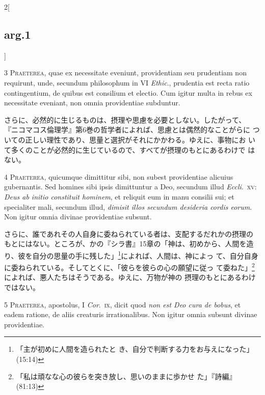 \documentclass[paper=a4paper,fontsize=10pt,jafontsize=9pt,titlepage]{jlreq}
\begin{document}
\begin{paracol}{2}[\subsection{arg.1}]

{\scshape 3 Praeterea}, quae ex necessitate eveniunt,
providentiam seu prudentiam non requirunt, unde, secundum philosophum in
VI {\itshape Ethic}., prudentia est recta ratio contingentium, de quibus est
consilium et electio. Cum igitur multa in rebus ex necessitate eveniant,
non omnia providentiae subduntur.

\switchcolumn

さらに、必然的に生じるものは、摂理や思慮を必要としない。したがって、
『ニコマコス倫理学』第6巻の哲学者によれば、思慮とは偶然的なことがらに
ついての正しい理性であり、思量と選択がそれにかかわる。ゆえに、事物にお
いて多くのことが必然的に生じているので、すべてが摂理のもとにあるわけで
はない。


{\scshape 4 Praeterea}, quicumque dimittitur sibi, non
subest providentiae alicuius gubernantis. Sed homines sibi ipsis
dimittuntur a Deo, secundum illud {\itshape Eccli}.~{\scshape xv}: {\itshape Deus ab initio constituit
hominem}, et reliquit eum in manu consilii sui; et specialiter mali,
secundum illud, {\itshape dimisit illos secundum desideria cordis eorum}. Non
igitur omnia divinae providentiae subsunt.

\switchcolumn

さらに、誰であれその人自身に委ねられている者は、支配するだれかの摂理の
もとにはない。ところが、かの『シラ書』15章の「神は、初めから、人間を造
り、彼を自分の思量の手に残した」\footnote{「主が初めに人間を造られたと
き、自分で判断する力をお与えになった」(15:14)}によれば、人間は、神によっ
て、自分自身に委ねられている。そしてとくに、「彼らを彼らの心の願望に従っ
て委ねた」\footnote{「私は頑なな心の彼らを突き放し、思いのままに歩かせ
た」『詩編』(81:13)}によれば、悪人たちはそうである。ゆえに、万物が神の
摂理のもとにあるわけではない。


{\scshape 5 Praeterea}, apostolus, I {\itshape Cor}.~{\scshape ix}, dicit quod
{\itshape non est Deo cura de bobus}, et eadem ratione, de aliis creaturis
irrationalibus. Non igitur omnia subsunt divinae providentiae.


\end{paracol}
\end{document}
